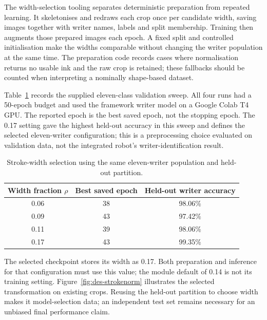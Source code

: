 
The width-selection tooling separates deterministic preparation from repeated learning. It skeletonises and redraws each crop once per candidate width, saving images together with writer names, labels and split membership. Training then augments those prepared images each epoch. A fixed split and controlled initialisation make the widths comparable without changing the writer population at the same time. The preparation code records cases where normalisation returns no usable ink and the raw crop is retained; these fallbacks should be counted when interpreting a nominally shape-based dataset.

Table~\ref{tab:des-widthselection} records the supplied eleven-class validation sweep. All four runs had a 50-epoch budget and used the framework writer model on a Google Colab T4 GPU. The reported epoch is the best saved epoch, not the stopping epoch. The 0.17 setting gave the highest held-out accuracy in this sweep and defines the selected eleven-writer configuration; this is a preprocessing choice evaluated on validation data, not the integrated robot's writer-identification result.


\begin{table}[!htbp]\centering\small
\begin{tabular}{|c|c|c|}
\hline\textbf{Width fraction $\rho$}&\textbf{Best saved epoch}&\textbf{Held-out writer accuracy}\\\hline
0.06&38&98.06\%\\\hline
0.09&43&97.42\%\\\hline
0.11&39&98.06\%\\\hline
0.17&43&99.35\%\\\hline
\end{tabular}
\caption{Stroke-width selection using the same eleven-writer population and held-out partition.}
\label{tab:des-widthselection}
\end{table}

The selected checkpoint stores its width as 0.17. Both preparation and inference for that configuration must use this value; the module default of 0.14 is not its training setting. Figure~\ref{fig:des-strokenorm} illustrates the selected transformation on existing crops. Reusing the held-out partition to choose width makes it model-selection data; an independent test set remains necessary for an unbiased final performance claim.


